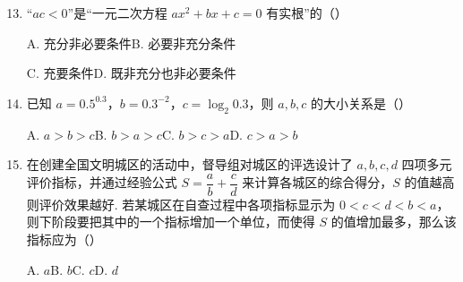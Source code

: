\documentclass[a4paper,11pt]{article}
\begin{document}
\begin{enumerate}
\ifanswer
\solbegin
{}
\solend
\fi

\end{enumerate}


\begin{enumerate}
\setcounter{enumi}{12}

\item “$ac<0$”是“一元二次方程 $ax^2+bx+c=0$ 有实根”的\mbox{（\quad）}

\keepwithprev
A. 充分非必要条件\qquad\qquad B. 必要非充分条件

C. 充要条件\qquad\qquad D. 既非充分也非必要条件

\ifanswer
\solbegin
{}
\solend
\fi

\item 已知 $a=0.5^{0.3}$，$b=0.3^{-2}$，$c=\log_2 0.3$，则 $a,b,c$ 的大小关系是\mbox{（\quad）}

\keepwithprev
A. $a>b>c$\qquad B. $b>a>c$\qquad C. $b>c>a$\qquad D. $c>a>b$

\ifanswer
\solbegin
{}
\solend
\fi

\item 在创建全国文明城区的活动中，督导组对城区的评选设计了 $a,b,c,d$ 四项多元评价指标，并通过经验公式 $S=\dfrac ab+\dfrac cd$ 来计算各城区的综合得分，$S$ 的值越高则评价效果越好. 若某城区在自查过程中各项指标显示为 $0<c<d<b<a$，则下阶段要把其中的一个指标增加一个单位，而使得 $S$ 的值增加最多，那么该指标应为\mbox{（\quad）}

\keepwithprev
A. $a$\qquad\qquad B. $b$\qquad\qquad C. $c$\qquad\qquad D. $d$

\ifanswer
\solbegin
{}
\solend
\fi


\end{enumerate}
\end{document}
